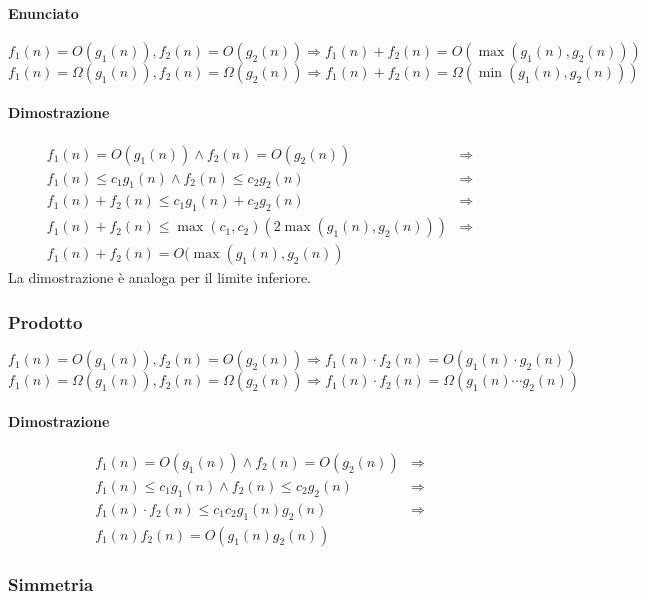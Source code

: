 \paragraph{Enunciato}
\begin{equation*}
f_1(n)=O(g_1(n)), f_2(n)=O(g_2(n))\Rightarrow f_1(n)+f_2(n)=O(\max(g_1(n), g_2(n)))
\end{equation*}
\begin{equation*}
f_1(n)=\Omega(g_1(n)), f_2(n)=\Omega(g_2(n))\Rightarrow f_1(n)+f_2(n)=\Omega(\min(g_1(n), g_2(n)))
\end{equation*}
\paragraph{Dimostrazione}
\begin{align*}
f_1(n)=O(g_1(n))\land f_2(n)=O(g_2(n))&\Rightarrow\\
f_1(n)\le c_1g_1(n)\land f_2(n)\le c_2g_2(n)&\Rightarrow\\
f_1(n)+f_2(n)\le c_1g_1(n)+c_2g_2(n)&\Rightarrow\\
f_1(n)+f_2(n)\le \max(c_1, c_2)(2\max(g_1(n), g_2(n)))&\Rightarrow\\
f_1(n)+f_2(n)=O(\max(g_1(n), g_2(n))& 
\end{align*}
La dimostrazione \`e analoga per il limite inferiore.
\subsubsection{Prodotto}
\begin{equation*}
f_1(n)=O(g_1(n)), f_2(n)=O(g_2(n))\Rightarrow f_1(n)\cdot f_2(n)=O(g_1(n)\cdot g_2(n))
\end{equation*}
\begin{equation*}
f_1(n)=\Omega(g_1(n)), f_2(n)=\Omega(g_2(n))\Rightarrow f_1(n)\cdot f_2(n)=\Omega(g_1(n)\cdots g_2(n))
\end{equation*}
\paragraph{Dimostrazione}
\begin{align*}
f_1(n)=O(g_1(n))\land f_2(n)=O(g_2(n))&\Rightarrow\\
f_1(n)\le c_1g_1(n)\land f_2(n)\le c_2g_2(n)&\Rightarrow\\
f_1(n)\cdot f_2(n)\le c_1c_2g_1(n)g_2(n)&\Rightarrow\\
f_1(n)f_2(n)=O(g_1(n)g_2(n))
\end{align*}
\subsubsection{Simmetria}
